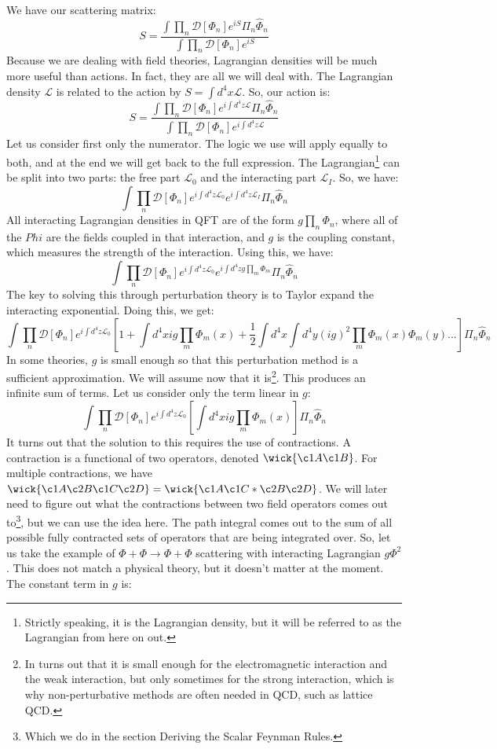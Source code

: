 \documentclass{report}
\begin{document}
We have our scattering matrix:
\[
S = \frac{\int \prod_n \mathcal{D}[\Phi_n] e^{iS}\Pi_n \hat{\Phi}_n}{\int \prod_n \mathcal{D}[\Phi_n] e^{iS}}
\]
Because we are dealing with field theories, Lagrangian densities will be much more useful than actions. In fact, they are all we will deal with. The Lagrangian density $\mathcal{L}$ is related to the action by $S = \int d^4x \mathcal{L}$. So, our action is:
\[
S = \frac{\int \prod_n \mathcal{D}[\Phi_n] e^{i\int d^4z \mathcal{L}}\Pi_n \hat{\Phi}_n}{\int \prod_n \mathcal{D}[\Phi_n] e^{i\int d^4z \mathcal{L}}}
\]
Let us consider first only the numerator. The logic we use will apply equally to both, and at the end we will get back to the full expression. The Lagrangian\footnote{Strictly speaking, it is the Lagrangian density, but it will be referred to as the Lagrangian from here on out.} can be split into two parts: the free part $\mathcal{L}_0$ and the interacting part $\mathcal{L}_I$. So, we have:
\[
\int \prod_n \mathcal{D}[\Phi_n] e^{i\int d^4z \mathcal{L}_0}e^{i\int d^4z \mathcal{L}_I} \Pi_n \hat{\Phi}_n
\]
All interacting Lagrangian densities in QFT are of the form $g \prod_n \Phi_n$, where all of the $Phi$ are the fields coupled in that interaction, and $g$ is the coupling constant, which measures the strength of the interaction. Using this, we have:
\[
\int \prod_n \mathcal{D}[\Phi_n] e^{i\int d^4z \mathcal{L}_0}e^{i\int d^4z g \prod_m \Phi_m} \Pi_n \hat{\Phi}_n
\]
The key to solving this through perturbation theory is to Taylor expand the interacting exponential. Doing this, we get:
\[
\int \prod_n \mathcal{D}[\Phi_n]
e^{i\int d^4z \mathcal{L}_0}
[1 + \int d^4x ig \prod_m \Phi_m(x) + \frac{1}{2} \int d^4x \int d^4y (ig)^2 \prod_m \Phi_m(x)\Phi_m(y)...]
\Pi_n \hat{\Phi}_n
\]
In some theories, $g$ is small enough so that this perturbation method is a sufficient approximation. We will assume now that it is\footnote{In turns out that it is small enough for the electromagnetic interaction and the weak interaction, but only sometimes for the strong interaction, which is why non-perturbative methods are often needed in QCD, such as lattice QCD.}.
This produces an infinite sum of terms. Let us consider only the term linear in $g$:
\[
\int \prod_n \mathcal{D}[\Phi_n]
e^{i\int d^4z \mathcal{L}_0}
[\int d^4x ig \prod_m \Phi_m(x)]
\Pi_n \hat{\Phi}_n
\]
It turns out that the solution to this requires the use of contractions. A contraction is a functional of two operators, denoted $\wick{\c1 A \c1 B}$. For multiple contractions, we have $\wick{\c1 A \c2 B \c1 C \c2 D} = \wick{\c1 A \c1 C * \c2 B \c2 D}$. We will later need to figure out what the contractions between two field operators comes out to\footnote{Which we do in the section Deriving the Scalar Feynman Rules.}, but we can use the idea here. The path integral comes out to the sum of all possible fully contracted sets of operators that are being integrated over. So, let us take the example of $\Phi + \Phi \rightarrow \Phi + \Phi$ scattering with interacting Lagrangian $g \Phi^2$. This does not match a physical theory, but it doesn't matter at the moment. The constant term in $g$ is:
\end{document}
